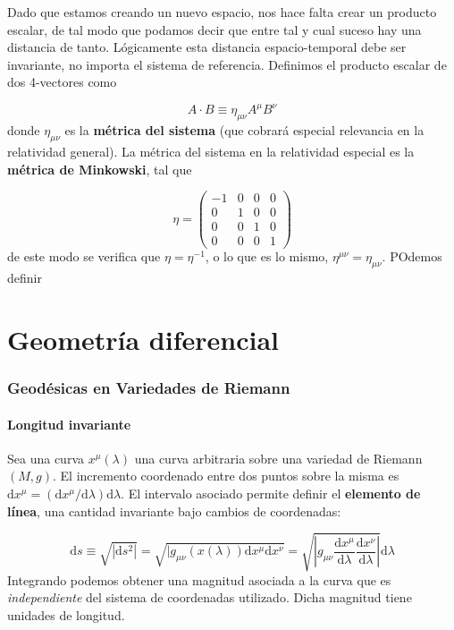 \documentclass[12pt,a4paper]{book}
\numberwithin{equation}{section}
\numberwithin{figure}{section}
\newcommand{\D}{\mathrm{d}}
\newcommand{\derivadas}[2]{\frac{\D #1}{\D #2}}
\begin{document}
Dado que estamos creando un nuevo espacio, nos hace falta crear un producto escalar, de tal modo que podamos decir que entre tal y cual suceso hay una distancia de tanto. Lógicamente esta distancia espacio-temporal debe ser invariante, no importa el sistema de referencia. Definimos el producto escalar de dos 4-vectores como

\begin{equation}
A \cdot B \equiv \eta_{\mu \nu} A^{\mu}  B^{\nu}
\end{equation}
donde $\eta_{\mu \nu}$ es la \textbf{métrica del sistema} (que cobrará especial relevancia en la relatividad general). La métrica del sistema en la relatividad especial es la \textbf{métrica de Minkowski}, tal que 


\begin{equation}
\eta = \begin{pmatrix}
-1 & 0 & 0 & 0 \\
 0 &  1  & 0 & 0 \\
0 & 0  & 1 & 0 \\
0 & 0  & 0 & 1
\end{pmatrix}
\end{equation}
de este modo se verifica que $\eta = \eta^{-1}$, o lo que es lo mismo, $\eta^{\mu \nu} = \eta_{\mu \nu}$. POdemos definir 


\newpage

\chapter{Geometría diferencial}

\subsection{Geodésicas en Variedades de Riemann}

\subsubsection{Longitud invariante}

Sea una curva $x^\mu (\lambda)$ una curva arbitraria sobre una variedad de Riemann $(M,g)$. El incremento coordenado entre dos puntos sobre la misma es $\D x^\mu = (\D x^\mu / \D \lambda) \D \lambda$. El intervalo asociado permite definir el \textbf{elemento de línea}, una cantidad invariante bajo cambios de coordenadas:


\begin{equation}
\D s \equiv \sqrt{|\D s^2 |} = \sqrt{|g_{\mu \nu} (x(\lambda)) \D x^\mu \D x^\nu} = \sqrt{\left| g_{\mu \nu} \derivadas{x^\mu}{\lambda} \derivadas{x^\nu}{\lambda} \right|} \D \lambda
\end{equation}
Integrando podemos obtener una magnitud asociada a la curva que es \textit{independiente} del sistema de coordenadas utilizado. Dicha magnitud tiene unidades de longitud.
\end{document}
